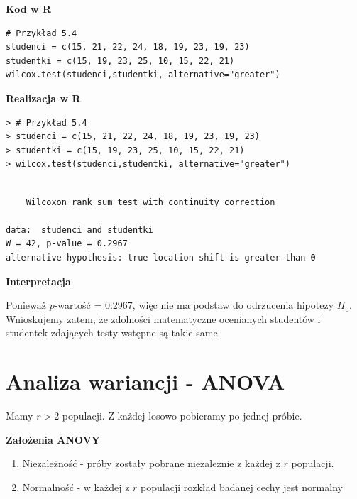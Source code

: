\documentclass[12pt,B5paper,]{book}
\providecommand{\tightlist}{%
  \setlength{\itemsep}{0pt}\setlength{\parskip}{0pt}}
\begin{document}
\vspace{0.8cm} \textbf{Kod w R}

\begin{verbatim}
# Przykład 5.4
studenci = c(15, 21, 22, 24, 18, 19, 23, 19, 23)
studentki = c(15, 19, 23, 25, 10, 15, 22, 21)
wilcox.test(studenci,studentki, alternative="greater")
\end{verbatim}

\vspace{0.8cm} \textbf{Realizacja w R}

\begin{verbatim}
> # Przykład 5.4
> studenci = c(15, 21, 22, 24, 18, 19, 23, 19, 23)
> studentki = c(15, 19, 23, 25, 10, 15, 22, 21)
> wilcox.test(studenci,studentki, alternative="greater")
\end{verbatim}

\begin{verbatim}

    Wilcoxon rank sum test with continuity correction

data:  studenci and studentki
W = 42, p-value = 0.2967
alternative hypothesis: true location shift is greater than 0
\end{verbatim}

\vspace{0.8cm} \textbf{Interpretacja}

Ponieważ \(p\)-wartość = 0.2967, więc nie ma podstaw do odrzucenia
hipotezy \(H_0\). Wnioskujemy zatem, że zdolności matematyczne
ocenianych studentów i studentek zdających testy wstępne są takie same.

\section{Analiza wariancji - ANOVA}\label{analiza-wariancji---anova}

Mamy \(r > 2\) populacji. Z każdej losowo pobieramy po jednej próbie.

\vspace{0.8cm}

\textbf{Założenia ANOVY}

\begin{enumerate}
\def\labelenumi{\arabic{enumi}.}
\tightlist
\item
  Niezależność - próby zostały pobrane niezależnie z każdej z \(r\)
  populacji.
\item
  Normalność - w każdej z \(r\) populacji rozkład badanej cechy jest
  normalny
\end{enumerate}
\end{document}
